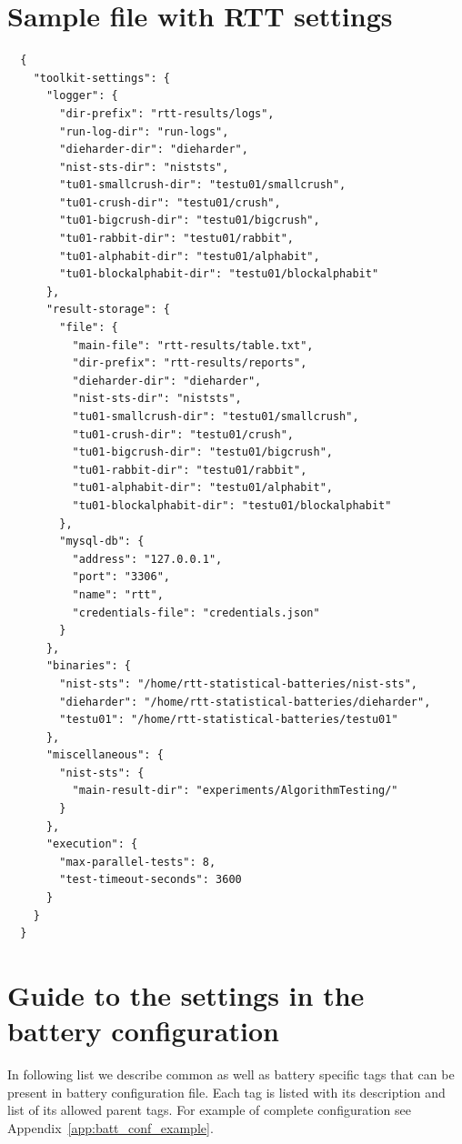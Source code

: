 \documentclass[
	digital,    %
	oneside,    %
	color,
	11pt,
	nocover,
	notable,
	nolof,
	nolot,
]{fithesis3}
\theoremstyle{definition}
\theoremstyle{remark}
\begin{document}
\chapter{Sample file with RTT settings}
\label{app:rtt_sett_json}
\begin{verbatim}
  {
    "toolkit-settings": {
      "logger": {
        "dir-prefix": "rtt-results/logs",
        "run-log-dir": "run-logs",
        "dieharder-dir": "dieharder",
        "nist-sts-dir": "niststs",
        "tu01-smallcrush-dir": "testu01/smallcrush",
        "tu01-crush-dir": "testu01/crush",
        "tu01-bigcrush-dir": "testu01/bigcrush",
        "tu01-rabbit-dir": "testu01/rabbit",
        "tu01-alphabit-dir": "testu01/alphabit",
        "tu01-blockalphabit-dir": "testu01/blockalphabit"
      },
      "result-storage": {
        "file": {
          "main-file": "rtt-results/table.txt",
          "dir-prefix": "rtt-results/reports",
          "dieharder-dir": "dieharder",
          "nist-sts-dir": "niststs",
          "tu01-smallcrush-dir": "testu01/smallcrush",
          "tu01-crush-dir": "testu01/crush",
          "tu01-bigcrush-dir": "testu01/bigcrush",
          "tu01-rabbit-dir": "testu01/rabbit",
          "tu01-alphabit-dir": "testu01/alphabit",
          "tu01-blockalphabit-dir": "testu01/blockalphabit"
        },
        "mysql-db": {
          "address": "127.0.0.1",
          "port": "3306",
          "name": "rtt",
          "credentials-file": "credentials.json"
        }
      },
      "binaries": {
        "nist-sts": "/home/rtt-statistical-batteries/nist-sts",
        "dieharder": "/home/rtt-statistical-batteries/dieharder",
        "testu01": "/home/rtt-statistical-batteries/testu01"
      },
      "miscellaneous": {
        "nist-sts": {
          "main-result-dir": "experiments/AlgorithmTesting/"
        }
      },
      "execution": {
        "max-parallel-tests": 8,
        "test-timeout-seconds": 3600
      }
    }
  }
\end{verbatim}

\chapter{Guide to the settings in the battery configuration}
\label{app:batt_conf_guide}
In following list we describe common as well as battery specific tags that can be present in battery configuration file. Each tag is listed with its description and list of its allowed parent tags. For example of complete configuration see Appendix~\ref{app:batt_conf_example}.
\end{document}
